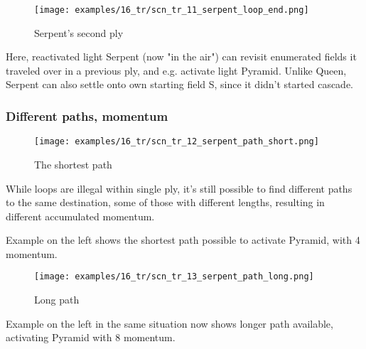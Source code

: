 \vspace*{-2.1\baselineskip}
\noindent
\begin{figure}[!h]
\texttt{[image: examples/16\_tr/scn\_tr\_11\_serpent\_loop\_end.png]}
\caption{Serpent's second ply}
\label{fig:scn_tr_11_serpent_loop_end}
\end{figure}

Here, reactivated light Serpent (now "in the air") can revisit enumerated fields
it traveled over in a previous ply, and e.g. activate light Pyramid. \newline
\indent
Unlike Queen, Serpent can also settle onto own starting field S, since it didn't
started cascade.

\clearpage %

\subsubsection*{Different paths, momentum}
\label{sec:Tamoanchan Revisited/Serpent/Movement/Different paths, momentum}

\vspace*{-0.7\baselineskip}
\noindent
\begin{wrapfigure}[9]{l}{0.4\textwidth}
\centering
\texttt{[image: examples/16\_tr/scn\_tr\_12\_serpent\_path\_short.png]}
\vspace*{-0.5\baselineskip}
\caption{The shortest path}
\label{fig:scn_tr_12_serpent_path_short}
\end{wrapfigure}
While loops are illegal within single ply, it's still possible to find
different paths to the same destination, some of those with different
lengths, resulting in different accumulated momentum.

Example on the left shows the shortest path possible to activate Pyramid,
with 4 momentum.


\vspace*{0.7\baselineskip}
\noindent
\begin{wrapfigure}[4]{l}{0.4\textwidth}
\centering
\texttt{[image: examples/16\_tr/scn\_tr\_13\_serpent\_path\_long.png]}
\vspace*{-0.5\baselineskip}
\caption{Long path}
\label{fig:scn_tr_13_serpent_path_long}
\end{wrapfigure}
Example on the left in the same situation now shows longer path available,
activating Pyramid with 8 momentum.

